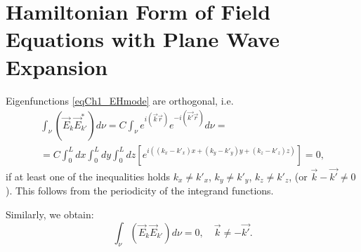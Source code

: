 \section{Hamiltonian Form of Field Equations with Plane Wave Expansion}
Eigenfunctions \eqref{eqCh1_EHmode} are orthogonal, i.e.
\begin{eqnarray}
\int_{\nu} \left( \vec{E}_k \vec{E}_{k'}^{*} \right) d \nu =
C \int_{\nu} e^{i \left(\vec{k}\vec{r}\right)} e^{- i
  \left(\vec{k'}\vec{r}\right)} d \nu =
\nonumber \\
= C \int_0^L d x \int_0^L d y \int_0^L d z
\left[ e^{i\left(
\left(k_x - k'_x\right) x +
\left(k_y - k'_y\right) y +
\left(k_z - k'_z\right) z
\right)}
\right] = 0,
\end{eqnarray}
if at least one of the inequalities holds 
$k_x \ne k'_x$,
$k_y \ne k'_y$,
$k_z \ne k'_z$,
(or 
$\vec{k} - \vec{k'} \ne 0$
). This follows from the periodicity of the integrand functions. 

Similarly, we obtain:
\begin{equation}
\int_{\nu} \left( \vec{E}_k \vec{E}_{k'} \right) d \nu = 0,
\quad
\vec{k} \ne - \vec{k'}.
\end{equation}

